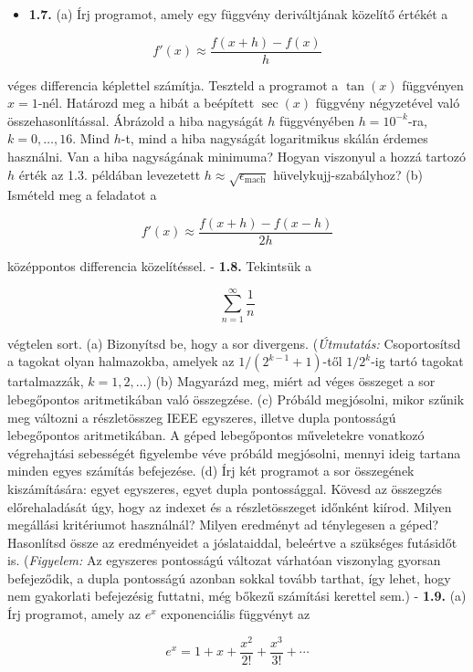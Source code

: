 \documentclass[
  magyar,
  11pt]{article}
\providecommand{\tightlist}{%
  \setlength{\itemsep}{0pt}\setlength{\parskip}{0pt}}
\begin{document}
\begin{itemize}
\tightlist
\item
  \textbf{1.7.} (a) Írj programot, amely egy függvény deriváltjának
  közelítő értékét a
\end{itemize}

\[f'(x) \approx \frac{f(x+h) - f(x)}{h}\]

véges differencia képlettel számítja. Teszteld a programot a \(\tan(x)\)
függvényen \(x = 1\)-nél. Határozd meg a hibát a beépített \(\sec(x)\)
függvény négyzetével való összehasonlítással. Ábrázold a hiba nagyságát
\(h\) függvényében \(h = 10^{-k}\)-ra, \(k = 0, \dots, 16\). Mind
\(h\)-t, mind a hiba nagyságát logaritmikus skálán érdemes használni.
Van a hiba nagyságának minimuma? Hogyan viszonyul a hozzá tartozó \(h\)
érték az 1.3. példában levezetett
\(h \approx \sqrt{\epsilon_{\text{mach}}}\) hüvelykujj-szabályhoz? (b)
Ismételd meg a feladatot a

\[f'(x) \approx \frac{f(x+h) - f(x-h)}{2h}\]

középpontos differencia közelítéssel. - \textbf{1.8.} Tekintsük a

\[\sum_{n=1}^{\infty} \frac{1}{n}\]

végtelen sort. (a) Bizonyítsd be, hogy a sor divergens.
(\emph{Útmutatás:} Csoportosítsd a tagokat olyan halmazokba, amelyek az
\(1/(2^{k-1} + 1)\)-től \(1/2^k\)-ig tartó tagokat tartalmazzák,
\(k = 1, 2, \dots\)) (b) Magyarázd meg, miért ad véges összeget a sor
lebegőpontos aritmetikában való összegzése. (c) Próbáld megjósolni,
mikor szűnik meg változni a részletösszeg IEEE egyszeres, illetve dupla
pontosságú lebegőpontos aritmetikában. A géped lebegőpontos műveletekre
vonatkozó végrehajtási sebességét figyelembe véve próbáld megjósolni,
mennyi ideig tartana minden egyes számítás befejezése. (d) Írj két
programot a sor összegének kiszámítására: egyet egyszeres, egyet dupla
pontossággal. Kövesd az összegzés előrehaladását úgy, hogy az indexet és
a részletösszeget időnként kiírod. Milyen megállási kritériumot
használnál? Milyen eredményt ad ténylegesen a géped? Hasonlítsd össze az
eredményeidet a jóslataiddal, beleértve a szükséges futásidőt is.
(\emph{Figyelem:} Az egyszeres pontosságú változat várhatóan viszonylag
gyorsan befejeződik, a dupla pontosságú azonban sokkal tovább tarthat,
így lehet, hogy nem gyakorlati befejezésig futtatni, még bőkezű
számítási kerettel sem.) - \textbf{1.9.} (a) Írj programot, amely az
\(e^x\) exponenciális függvényt az

\[e^x = 1 + x + \frac{x^2}{2!} + \frac{x^3}{3!} + \cdots\]
\end{document}
